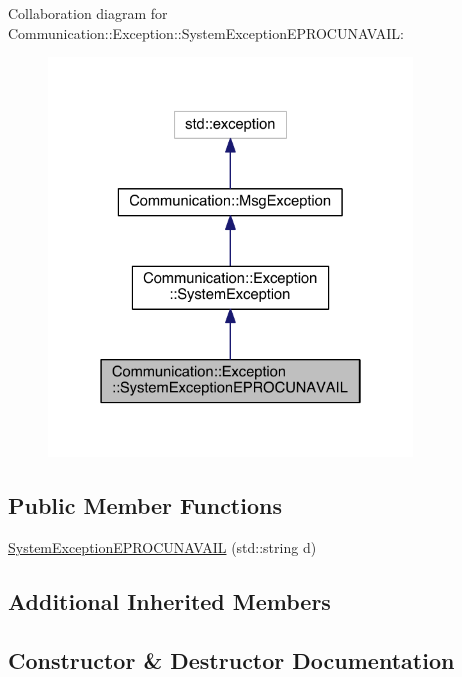Collaboration diagram for Communication\+:\+:Exception\+:\+:System\+Exception\+E\+P\+R\+O\+C\+U\+N\+A\+V\+A\+I\+L\+:\nopagebreak
\begin{figure}[H]
\begin{center}
\leavevmode
\includegraphics[width=274pt]{class_communication_1_1_exception_1_1_system_exception_e_p_r_o_c_u_n_a_v_a_i_l__coll__graph}
\end{center}
\end{figure}
\subsection*{Public Member Functions}
\begin{DoxyCompactItemize}
\item 
\hyperlink{class_communication_1_1_exception_1_1_system_exception_e_p_r_o_c_u_n_a_v_a_i_l_a373d0f85b2399a35a9bd988956e00249}{System\+Exception\+E\+P\+R\+O\+C\+U\+N\+A\+V\+A\+I\+L} (std\+::string d)
\end{DoxyCompactItemize}
\subsection*{Additional Inherited Members}


\subsection{Constructor \& Destructor Documentation}
\hypertarget{class_communication_1_1_exception_1_1_system_exception_e_p_r_o_c_u_n_a_v_a_i_l_a373d0f85b2399a35a9bd988956e00249}{}
